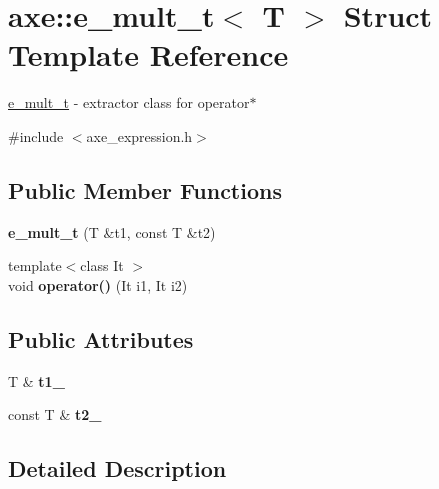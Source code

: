 \hypertarget{structaxe_1_1e__mult__t}{\section{axe\+:\+:e\+\_\+mult\+\_\+t$<$ T $>$ Struct Template Reference}
\label{structaxe_1_1e__mult__t}
}


\hyperlink{structaxe_1_1e__mult__t}{e\+\_\+mult\+\_\+t} -\/ extractor class for operator$\ast$  




{\ttfamily \#include $<$axe\+\_\+expression.\+h$>$}

\subsection*{Public Member Functions}
\begin{DoxyCompactItemize}
\item 
\hypertarget{structaxe_1_1e__mult__t_a61f66c1d59d77158da525624c2505a4e}{{\bfseries e\+\_\+mult\+\_\+t} (T \&t1, const T \&t2)}\label{structaxe_1_1e__mult__t_a61f66c1d59d77158da525624c2505a4e}

\item 
\hypertarget{structaxe_1_1e__mult__t_a24d6087ddf2b49b75252657f41aa9d5f}{{\footnotesize template$<$class It $>$ }\\void {\bfseries operator()} (It i1, It i2)}\label{structaxe_1_1e__mult__t_a24d6087ddf2b49b75252657f41aa9d5f}

\end{DoxyCompactItemize}
\subsection*{Public Attributes}
\begin{DoxyCompactItemize}
\item 
\hypertarget{structaxe_1_1e__mult__t_a856b43fbe91804a36d3a0a9baade0650}{T \& {\bfseries t1\+\_\+}}\label{structaxe_1_1e__mult__t_a856b43fbe91804a36d3a0a9baade0650}

\item 
\hypertarget{structaxe_1_1e__mult__t_a86fab623fbbf8d0609160be8bcb6d1fb}{const T \& {\bfseries t2\+\_\+}}\label{structaxe_1_1e__mult__t_a86fab623fbbf8d0609160be8bcb6d1fb}

\end{DoxyCompactItemize}


\subsection{Detailed Description}
